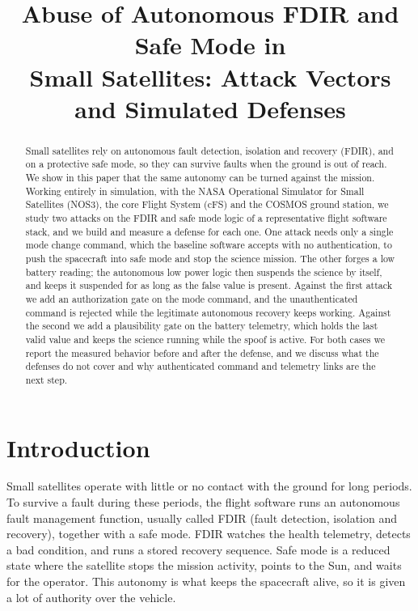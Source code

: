 \documentclass[conference,letterpaper,10pt]{IEEEtran}
\begin{document}
\title{Abuse of Autonomous FDIR and Safe Mode in\\ Small Satellites: Attack Vectors and Simulated Defenses}

\author{
}

\maketitle

\begin{abstract}
Small satellites rely on autonomous fault detection, isolation and recovery (FDIR), and on a protective safe mode, so they can survive faults when the ground is out of reach. We show in this paper that the same autonomy can be turned against the mission. Working entirely in simulation, with the NASA Operational Simulator for Small Satellites (NOS3), the core Flight System (cFS) and the COSMOS ground station, we study two attacks on the FDIR and safe mode logic of a representative flight software stack, and we build and measure a defense for each one. One attack needs only a single mode change command, which the baseline software accepts with no authentication, to push the spacecraft into safe mode and stop the science mission. The other forges a low battery reading; the autonomous low power logic then suspends the science by itself, and keeps it suspended for as long as the false value is present. Against the first attack we add an authorization gate on the mode command, and the unauthenticated command is rejected while the legitimate autonomous recovery keeps working. Against the second we add a plausibility gate on the battery telemetry, which holds the last valid value and keeps the science running while the spoof is active. For both cases we report the measured behavior before and after the defense, and we discuss what the defenses do not cover and why authenticated command and telemetry links are the next step.
\end{abstract}

\section{Introduction}
Small satellites operate with little or no contact with the ground for long periods. To survive a fault during these periods, the flight software runs an autonomous fault management function, usually called FDIR (fault detection, isolation and recovery), together with a safe mode. FDIR watches the health telemetry, detects a bad condition, and runs a stored recovery sequence. Safe mode is a reduced state where the satellite stops the mission activity, points to the Sun, and waits for the operator. This autonomy is what keeps the spacecraft alive, so it is given a lot of authority over the vehicle.
\end{document}
